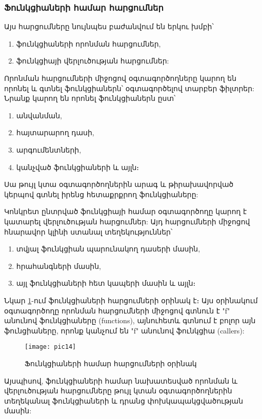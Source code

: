 \subsubsection*{Ֆունկցիաների համար հարցումներ}\label{subsubsec:functions}

Այս հարցումները նույնպես բաժանվում են երկու խմբի՝
\begin{enumerate}
    \item ֆունկցիաների որոնման հարցումներ,
    \item ֆունկցիայի վերլուծության հարցումներ:
\end{enumerate}

Որոնման հարցումների միջոցով օգտագործողները կարող են որոնել և գտնել ֆունկցիաներն՝ օգտագործելով տարբեր ֆիլտրեր:
Նրանք կարող են որոնել ֆունկցիաներն ըստ՝
\begin{enumerate}
    \item անվանման,
    \item հայտարարող դասի,
    \item արգումենտների,
    \item կանչված ֆունկցիաների և այլն։
\end{enumerate}

Սա թույլ կտա օգտագործողներին արագ և թիրախավորված կերպով գտնել իրենց հետաքրքրող ֆունկցիաները:

Կոնկրետ ընտրված ֆունկցիայի համար օգտագործողը կարող է կատարել վերլուծության հարցումներ: Այդ հարցումների միջոցով հնարավոր
կլինի ստանալ տեղեկություններ՝
\begin{enumerate}
    \item տվյալ ֆունկցիան պարունակող դասերի մասին,
    \item հրահանգների մասին,
    \item այլ ֆունկցիաների հետ կապերի մասին և այլն։
\end{enumerate}

Նկար \ref{fig:figure14}-ում ֆունկցիաների հարցումների օրինակ է։ Այս օրինակում օգտագործողը որոնման հարցումների միջոցով գտնուն է
"f" անունով ֆունկցիաները (functions), այնուհետև գտնում է բոլոր այն ֆունցիաները, որոնք կանչում են "f" անունով ֆունկցիա (callers):

\begin{figure}[h]
    \centering
    \texttt{[image: pic14]}
    \caption{Ֆունկցիաների համար հարցումների օրինակ}
    \label{fig:figure14}
\end{figure}

Այսպիսով, ֆունկցիաների համար նախատեսված որոնման և վերլուծության հարցումները թույլ կտան օգտագործողներին տեղեկանալ ֆունկցիաների
և դրանց փոխկապակցվածության մասին:
